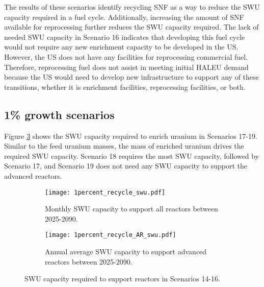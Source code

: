 The results of these scenarios identify recycling \gls{SNF} as a way 
to reduce the \gls{SWU} capacity required in a fuel cycle. Additionally, 
increasing the amount of \gls{SNF} available for reprocessing further 
reduces the \gls{SWU} capacity required. The lack of needed 
\gls{SWU} capacity in Scenario 16 indicates that developing this 
fuel cycle would not require any new enrichment capacity to be developed 
in the US.  However, the US does not have 
any facilities for reprocessing commercial fuel. Therefore, reprocessing
fuel does not assist in meeting initial \gls{HALEU} demand because 
the US would need to develop new infrastructure to support any 
of these transitions, whether it is enrichment facilities, 
reprocessing facilities, or both.

\subsection{1\% growth scenarios}
Figure \ref{fig:1percent_recycle_swu} shows the \gls{SWU} capacity 
required to enrich uranium in Scenarios 17-19. Similar to the 
feed uranium masses, the mass of enriched uranium drives 
the required \gls{SWU} capacity. Scenario 18 requires the most 
\gls{SWU} capacity, followed by Scenario 17, and Scenario 19 does 
not need any \gls{SWU} capacity to support the advanced reactors. 

\begin{figure}[h!]
    \centering
    \begin{subfigure}[b]{0.45\textwidth}
        \centering
        \texttt{[image: 1percent\_recycle\_swu.pdf]}
        \caption{Monthly SWU capacity to support all reactors between 2025-2090.}
        \label{fig:1percent_recycle_swu_all}
    \end{subfigure}
    \hfill
    \begin{subfigure}[b]{0.45\textwidth}
        \centering
        \texttt{[image: 1percent\_recycle\_AR\_swu.pdf]}
        \caption{Annual average SWU capacity to support 
        advanced reactors between 2025-2090.}
        \label{fig:1percent_recycle_swu_AR}
    \end{subfigure}
       \caption{\gls{SWU} capacity required to support reactors in Scenarios 14-16.}
       \label{fig:1percent_recycle_swu}
\end{figure}

